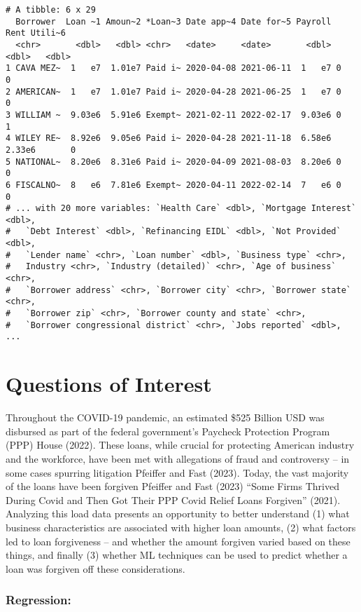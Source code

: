 \documentclass[
  letterpaper,
  DIV=11,
  numbers=noendperiod]{scrartcl}
\begin{document}
\begin{verbatim}
# A tibble: 6 x 29
  Borrower  Loan ~1 Amoun~2 *Loan~3 Date app~4 Date for~5 Payroll   Rent Utili~6
  <chr>       <dbl>   <dbl> <chr>   <date>     <date>       <dbl>  <dbl>   <dbl>
1 CAVA MEZ~  1   e7  1.01e7 Paid i~ 2020-04-08 2021-06-11  1   e7 0            0
2 AMERICAN~  1   e7  1.01e7 Paid i~ 2020-04-28 2021-06-25  1   e7 0            0
3 WILLIAM ~  9.03e6  5.91e6 Exempt~ 2021-02-11 2022-02-17  9.03e6 0            1
4 WILEY RE~  8.92e6  9.05e6 Paid i~ 2020-04-28 2021-11-18  6.58e6 2.33e6       0
5 NATIONAL~  8.20e6  8.31e6 Paid i~ 2020-04-09 2021-08-03  8.20e6 0            0
6 FISCALNO~  8   e6  7.81e6 Exempt~ 2020-04-11 2022-02-14  7   e6 0            0
# ... with 20 more variables: `Health Care` <dbl>, `Mortgage Interest` <dbl>,
#   `Debt Interest` <dbl>, `Refinancing EIDL` <dbl>, `Not Provided` <dbl>,
#   `Lender name` <chr>, `Loan number` <dbl>, `Business type` <chr>,
#   Industry <chr>, `Industry (detailed)` <chr>, `Age of business` <chr>,
#   `Borrower address` <chr>, `Borrower city` <chr>, `Borrower state` <chr>,
#   `Borrower zip` <chr>, `Borrower county and state` <chr>,
#   `Borrower congressional district` <chr>, `Jobs reported` <dbl>, ...
\end{verbatim}

\hypertarget{questions-of-interest}{%
\section{Questions of Interest}\label{questions-of-interest}}

Throughout the COVID-19 pandemic, an estimated \$525 Billion USD was
disbursed as part of the federal government's Paycheck Protection
Program (PPP) House (2022). These loans, while crucial for protecting
American industry and the workforce, have been met with allegations of
fraud and controversy -- in some cases spurring litigation Pfeiffer and
Fast (2023). Today, the vast majority of the loans have been forgiven
Pfeiffer and Fast (2023) {``Some Firms Thrived During {Covid} and Then
Got Their {PPP} {Covid} Relief Loans Forgiven''} (2021). Analyzing this
load data presents an opportunity to better understand (1) what business
characteristics are associated with higher loan amounts, (2) what
factors led to loan forgiveness -- and whether the amount forgiven
varied based on these things, and finally (3) whether ML techniques can
be used to predict whether a loan was forgiven off these considerations.

\hypertarget{regression}{%
\subsubsection{Regression:}\label{regression}}
\end{document}

